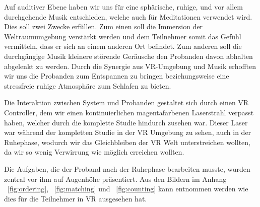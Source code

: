 Auf auditiver Ebene haben wir uns für eine sphärische, ruhige, und vor allem durchgehende Musik entschieden, welche auch für Meditationen verwendet wird. Dies soll zwei Zwecke erfüllen. Zum einen soll die Immersion der Weltraumumgebung verstärkt werden und dem Teilnehmer somit das Gefühl vermitteln, dass er sich an einem anderen Ort befindet. Zum anderen soll die durchgängige Musik kleinere störende Geräusche den Probanden davon abhalten abgelenkt zu werden.
Durch die Synergie aus VR-Umgebung und Musik erhofften wir uns die Probanden zum Entspannen zu bringen beziehungsweise eine stressfreie ruhige Atmosphäre zum Schlafen zu bieten.

Die Interaktion zwischen System und Probanden gestaltet sich durch einen VR Controller, dem wir einen kontinuierlichen magentafarbenen Laserstrahl verpasst haben, welcher durch die komplette Studie hindurch zusehen war. Dieser Laser war während der kompletten Studie in der VR Umgebung zu sehen, auch in der Ruhephase, wodurch wir das Gleichbleiben der VR Welt unterstreichen wollten, da wir so wenig Verwirrung wie möglich erreichen wollten.

Die Aufgaben, die der Proband nach der Ruhephase bearbeiten musste, wurden zentral vor ihm auf Augenhöhe präsentiert. Aus den Bildern im Anhang ~\ref{fig:ordering}, ~\ref{fig:matching} und ~\ref{fig:counting} kann entnommen werden wie dies für die Teilnehmer in VR ausgesehen hat.